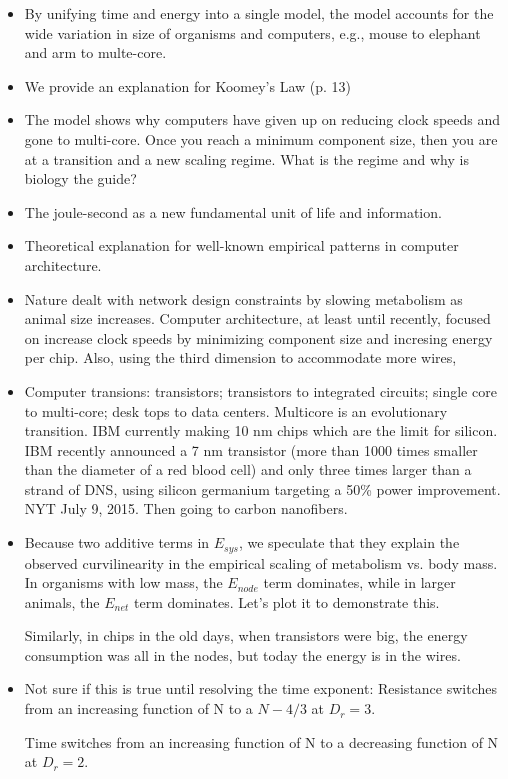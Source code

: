 \documentclass[12pt]{article}
\begin{document}
\begin{itemize}
\item By unifying time and energy into a single model, the model
  accounts for the wide variation in size of organisms and computers,
  e.g., mouse to elephant and arm to multe-core.

\item We provide an explanation for Koomey's Law (p. 13)

\item The model shows why computers have given up on reducing clock
  speeds and gone to multi-core.  Once you reach a minimum component
  size, then you are at a transition and a new scaling regime.  What
  is the regime and why is biology the guide?

\item The joule-second as a new fundamental unit of life and
  information.

\item Theoretical explanation for well-known empirical patterns in
  computer architecture.

\item Nature dealt with network design constraints by slowing
  metabolism as animal size increases.  Computer architecture, at
  least until recently, focused on increase clock speeds by minimizing
  component size and incresing energy per chip.  Also, using the third dimension to accommodate more wires, 

\item Computer transions: transistors; transistors to
  integrated circuits; single core to multi-core; desk tops to data centers.
Multicore is an evolutionary transition.  IBM currently making 10 nm chips which are the limit for
  silicon.  IBM recently announced a 7 nm
transistor (more than 1000 times smaller than the diameter of a red
blood cell) and only three times larger than a strand of DNS, using
silicon germanium targeting a 50\% power improvement.  NYT July 9,
2015.  Then going to carbon nanofibers. 

\item Because two additive terms in $E_{sys}$, we speculate that they explain the
observed curvilinearity in the empirical scaling of metabolism vs. body
mass.  In organisms with low mass, the $E_{node}$ term dominates, while in
larger animals, the $E_{net}$ term dominates.  Let's plot it to
demonstrate this.

Similarly, in chips in the old days, when transistors were big, the
energy consumption was all in the nodes, but today the energy is in the
wires.

\item Not sure if this is true until resolving the time exponent: 
Resistance switches from an increasing function of N to a $N-{4/3}$ at $D_r
= 3$.

Time switches from an increasing function of N to a decreasing function
of N at $D_r = 2$.

\end{itemize}
\end{document}
